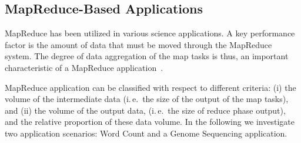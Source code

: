\documentclass{acm_proc_article-sp}
\newcommand{\jhanote}[1]{ {\textcolor{red} { ***SJ: #1 }}}
\newcommand{\alnote}[1]{ {\textcolor{blue} { ***andreL: #1 }}}
\newcommand{\alnote}[1]{}
\newcommand{\jhanote}[1]{}
\newcommand{\upp}{\vspace*{-0.5em}}
\newcommand{\pilotmapreduce}{Pilot-MapReduce\xspace}
\begin{document}
\subsection{MapReduce-Based Applications}

MapReduce has been utilized in various science applications. A key performance 
factor is the amount of data that must be moved through the MapReduce system. 
The degree of data aggregation of the map tasks is thus, an important 
characteristic of a MapReduce application~\cite{weissman-mr-11}.

MapReduce application can be classified with respect to different
criteria: (i) the volume of the intermediate data (i.\,e.\ the size of
the output of the map tasks), and (ii) the volume of the output data,
(i.\,e.\ the size of reduce phase output), and the relative proportion
of these data volume. In the following we investigate two application
scenarios: Word Count and a Genome Sequencing application.


\end{document}
